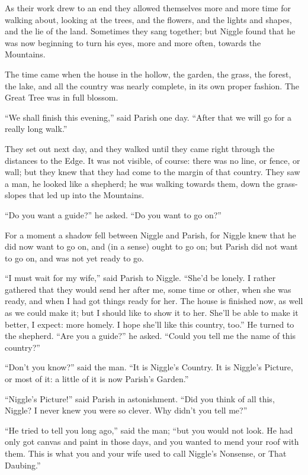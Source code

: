 \documentclass[english]{scrartcl}
\begin{document}
As their work drew to an end they allowed themselves more and more time for walking about, looking at the trees, and the flowers, and the lights and shapes, and the lie of the land. Sometimes they sang together; but Niggle found that he was now beginning to turn his eyes, more and more often, towards the Mountains.

The time came when the house in the hollow, the garden, the grass, the forest, the lake, and all the country was nearly complete, in its own proper fashion. The Great Tree was in full blossom.

“We shall finish this evening,” said Parish one day. “After that we will go for a really long walk.”

They set out next day, and they walked until they came right through the distances to the Edge. It was not visible, of course: there was no line, or fence, or wall; but they knew that they had come to the margin of that country. They saw a man, he looked like a shepherd; he was walking towards them, down the grass-slopes that led up into the Mountains.

“Do you want a guide?” he asked. “Do you want to go on?”

For a moment a shadow fell between Niggle and Parish, for Niggle knew that he did now want to go on, and (in a sense) ought to go on; but Parish did not want to go on, and was not yet ready to go.

“I must wait for my wife,” said Parish to Niggle. “She’d be lonely. I rather gathered that they would send her after me, some time or other, when she was ready, and when I had got things ready for her. The house is finished now, as well as we could make it; but I should like to show it to her. She’ll be able to make it better, I expect: more homely. I hope she’ll like this country, too.” He turned to the shepherd. “Are you a guide?” he asked. “Could you tell me the name of this country?”

“Don’t you know?” said the man. “It is Niggle’s Country. It is Niggle’s Picture, or most of it: a little of it is now Parish’s Garden.”

“Niggle’s Picture!” said Parish in astonishment. “Did you think of all this, Niggle? I never knew you were so clever. Why didn’t you tell me?”

“He tried to tell you long ago,” said the man; “but you would not look. He had only got canvas and paint in those days, and you wanted to mend your roof with them. This is what you and your wife used to call Niggle’s Nonsense, or That Daubing.”
\end{document}
